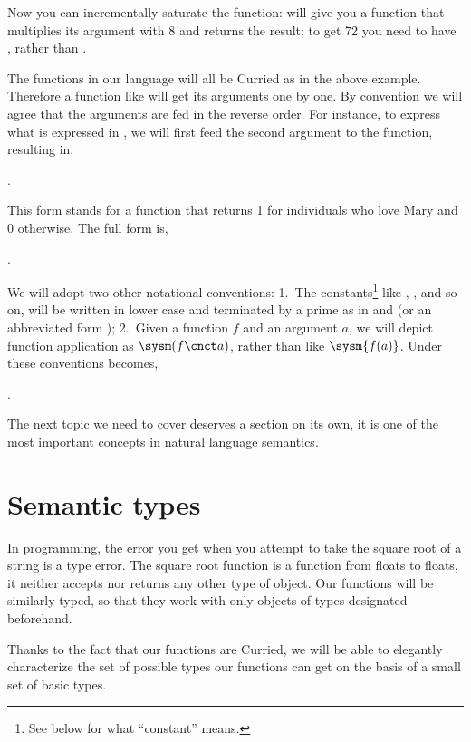 \documentclass[11pt,a4paper,draft]{article}
\begin{document}
Now you can incrementally saturate the function:  will give you a function that multiplies its argument with 8 and returns the result; to get 72 you need to have , rather than .

The functions in our language will all be Curried as in the above example. Therefore a function like  will get its arguments one by one. By convention we will agree that the arguments are fed in the reverse order. For instance, to express what is expressed in , we will first feed the second argument to the function, resulting in,

\ex.\label{lovesmary} 


This form stands for a function that returns 1 for individuals who love Mary and 0 otherwise. The full form is,


\ex.\label{lovesmaryjohn} 


We will adopt two other notational conventions: 1.\ The constants\footnote{See below for what ``constant'' means.} like , , and so on, will be written in lower case and terminated by a prime as in  and  (or an abbreviated form ); 2.\ Given a function $f$ and an argument $a$, we will depict function application as $\sysm(f\cnct a)$, rather than like $\sysm{f(a)}$. Under these conventions   becomes,

\ex. 

The next topic we need to cover deserves a section on its own, it is one of the most important concepts in natural language semantics.

\section{Semantic types}
	
In programming, the error you get when you attempt to take the square root of a string is a type error. The square root function is a function from floats to floats, it neither accepts nor returns any other type of object.  Our functions will be similarly typed, so that they work with only objects of types designated beforehand.


Thanks to the fact that our functions are Curried, we will be able to elegantly characterize the set of possible types our functions can get on the basis of a small set of basic types.
\end{document}
